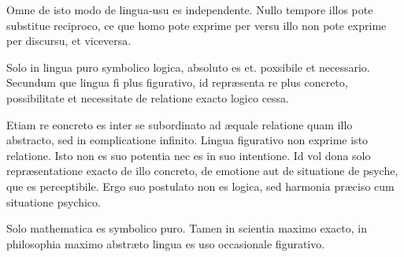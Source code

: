 Omne de isto modo de lingua-usu es independente. Nullo tempore illos pote substitue
reciproco, ce que homo pote exprime per versu illo non pote exprime per discursu, et
viceversa.

Solo in lingua puro symbolico logica, absoluto es et. poxsibile et necessario. Secundum
que lingua fi plus figurativo, id repr\ae{}senta re plus concreto, possibilitate et
necessitate de relatione exacto logico cessa.

Etiam re eoncreto es inter se subordinato ad \ae{}quale relatione quam illo abstracto,
sed in eomplicatione infinito. Lingua figurativo non exprime isto relatione. Isto non es
suo potentia nec es in suo intentione. Id vol dona solo repr\ae{}sentatione exacto de
illo concreto, de emotione aut de situatione de psyche, que es perceptibile. Ergo suo
postulato non es logica, sed harmonia pr\ae{}ciso cum situatione psychico.

Solo mathematica es symbolico puro. Tamen in scientia maximo exacto, in philosophia
maximo abstr\ae{}to lingua es uso occasionale figurativo.
